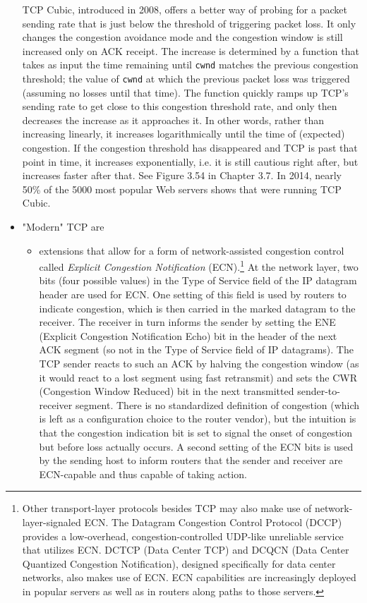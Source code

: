 \documentclass[8pt, table, xcdraw]{article}%
\begin{document}
\begin{itemize}
    TCP Cubic, introduced in 2008, offers a better way of probing for a packet sending rate that is just below the threshold of triggering packet loss. It only changes the congestion avoidance mode and the congestion window is still increased only on ACK receipt. The increase is determined by a function that takes as input the time remaining until \lstinline{cwnd} matches the previous congestion threshold; the value of \lstinline{cwnd} at which the previous packet loss was triggered (assuming no losses until that time). The function quickly ramps up TCP’s sending rate to get close to this congestion threshold rate, and only then decreases the increase as it approaches it. In other words, rather than increasing linearly, it increases logarithmically until the time of (expected) congestion. If the congestion threshold has disappeared and TCP is past that point in time, it increases exponentially, i.e. it is still cautious right after, but increases faster after that. See Figure 3.54 in Chapter 3.7. In 2014, nearly 50\% of the 5000 most popular Web servers shows that were running TCP Cubic.
    \item "Modern" TCP are
    \begin{itemize}
        \item extensions that allow for a form of network-assisted congestion control called \emph{Explicit Congestion Notification} (ECN).\footnote{Other transport-layer protocols besides TCP may also make use of network-layer-signaled ECN. The Datagram Congestion Control Protocol (DCCP) provides a low-overhead, congestion-controlled UDP-like unreliable service that utilizes ECN. DCTCP (Data Center TCP) and DCQCN (Data Center Quantized Congestion Notification), designed specifically for data center networks, also makes use of ECN. ECN capabilities are increasingly deployed in popular servers as well as in routers along paths to those servers.} At the network layer, two bits (four possible values) in the Type of Service field of the IP datagram header are used for ECN. One setting of this field is used by routers to indicate congestion, which is then carried in the marked datagram to the receiver. The receiver in turn informs the sender by setting the ENE (Explicit Congestion Notification Echo) bit in the header of the next ACK segment (so not in the Type of Service field of IP datagrams). The TCP sender reacts to such an ACK by halving the congestion window (as it would react to a lost segment using fast retransmit) and sets the CWR (Congestion Window Reduced) bit in the next transmitted sender-to-receiver segment. There is no standardized definition of congestion (which is left as a configuration choice to the router vendor), but the intuition is that the congestion indication bit is set to signal the onset of congestion but before loss actually occurs. A second setting of the ECN bits is used by the sending host to inform routers that the sender and receiver are ECN-capable and thus capable of taking action.

\end{itemize}
\end{itemize}
\end{document}
